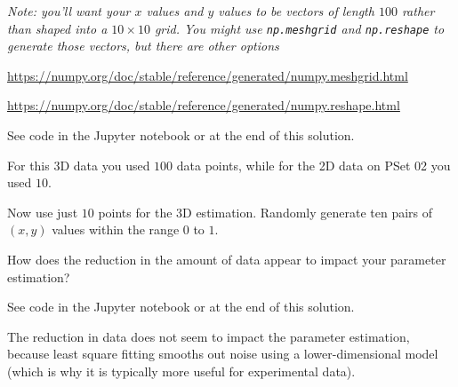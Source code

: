 \documentclass[12pt,letterpaper,answers]{exam}
\newcommand{\vc}[1]{\boldsymbol{#1}}
\begin{document}
\begin{questions}
\begin{parts}
\emph{Note: you'll want your $x$ values and $y$ values to be vectors of length $100$ rather than shaped into a $10\times 10$ grid.  You might use \texttt{np.meshgrid} and \texttt{np.reshape} to generate those vectors, but there are other options}  %

\url{https://numpy.org/doc/stable/reference/generated/numpy.meshgrid.html}

\url{https://numpy.org/doc/stable/reference/generated/numpy.reshape.html}

\begin{solution}
    See code in the Jupyter notebook or at the end of this solution.
\end{solution}

\item For this 3D data you used $100$ data points, while for the 2D data on PSet 02 you used $10$.

Now use just $10$ points for the 3D estimation.  Randomly generate ten pairs of $(x,y)$ values within the range $0$ to $1$.

How does the reduction in the amount of data appear to impact your parameter estimation?

\begin{solution}
    See code in the Jupyter notebook or at the end of this solution.

    The reduction in data does not seem to impact the parameter estimation, because least square fitting smooths out noise using a lower-dimensional model (which is why it is typically more useful for experimental data).
\end{solution}

\end{parts}









\end{questions}
  
\end{document}
